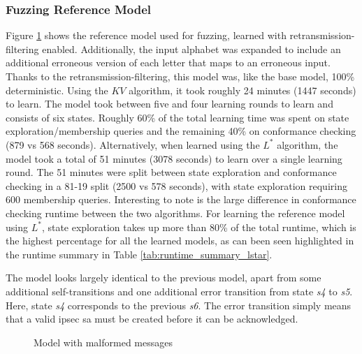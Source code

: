 \subsubsection*{Fuzzing Reference Model}
Figure \ref{fig:withfilterwitherrors} shows the reference model used for fuzzing, learned with retransmission-filtering enabled. Additionally, the input alphabet was expanded to include an additional erroneous version of each letter that maps to an erroneous input. Thanks to the retransmission-filtering, this model was, like the base model, 100\% deterministic. Using the $KV$ algorithm, it took roughly 24 minutes (1447 seconds) to learn. The model took between five and four learning rounds to learn and consists of six states. Roughly 60\% of the total learning time was spent on state exploration/membership queries and the remaining 40\% on conformance checking (879 vs 568 seconds). Alternatively, when learned using the $L^*$ algorithm, the model took a total of 51 minutes (3078 seconds) to learn over a single learning round. The 51 minutes were split between state exploration and conformance checking in a 81-19 split (2500 vs 578 seconds), with state exploration requiring 600 membership queries. Interesting to note is the large difference in conformance checking runtime between the two algorithms. For learning the reference model using $L^*$, state exploration takes up more than 80\% of the total runtime, which is the highest percentage for all the learned models, as can been seen highlighted in the runtime summary in Table \ref{tab:runtime_summary_lstar}.

The model looks largely identical to the previous model, apart from some additional self-transitions and one additional error transition from state \emph{s4} to \emph{s5}. Here, state \emph{s4} corresponds to the previous \emph{s6}. The error transition simply means that a valid \ac{ipsec} \ac{sa} must be created before it can be acknowledged.


\begin{figure}[ht]
	\vspace*{\fill}
	\noindent
	\hspace*{-4.5\oddsidemargin}%
	\caption{Model with malformed messages}
	\label{fig:withfilterwitherrors}
	\vspace*{\fill}
\end{figure}

